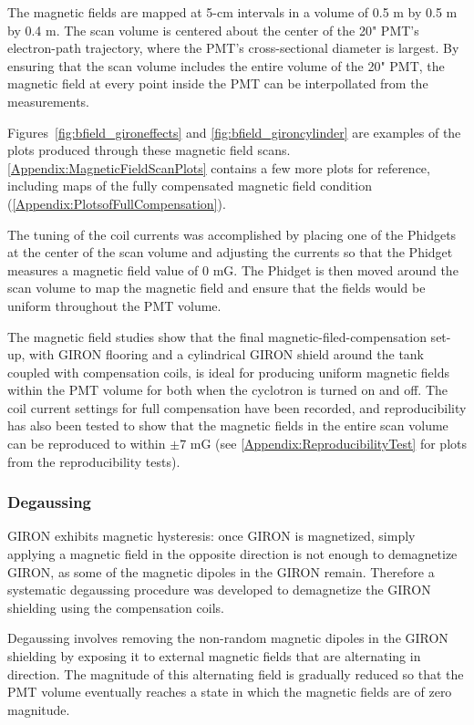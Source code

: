 The magnetic fields are mapped at 5-cm intervals in a volume of 0.5 m by 0.5 m by 0.4 m. The scan volume is centered about the center of the 20" PMT's electron-path trajectory, where the PMT's cross-sectional diameter is largest. By ensuring that the scan volume includes the entire volume of the 20" PMT, the magnetic field at every point inside the PMT can be interpollated from the measurements.

Figures~\ref{fig:bfield_gironeffects} and \ref{fig:bfield_gironcylinder} are examples of the plots produced through these magnetic field scans. \ref{Appendix:MagneticFieldScanPlots} contains a few more plots for reference, including maps of the fully compensated magnetic field condition (\ref{Appendix:PlotsofFullCompensation}).

The tuning of the coil currents was accomplished by placing one of the Phidgets at the center of the scan volume and adjusting the currents so that the Phidget measures a magnetic field value of 0 mG. The Phidget is then moved around the scan volume to map the magnetic field and ensure that the fields would be uniform throughout the PMT volume.

The magnetic field studies show that the final magnetic-filed-compensation set-up, with GIRON flooring and a cylindrical GIRON shield around the tank coupled with compensation coils, is ideal for producing uniform magnetic fields within the PMT volume for both when the cyclotron is turned on and off. The coil current settings for full compensation have been recorded, and reproducibility has also been tested to show that the magnetic fields in the entire scan volume can be reproduced to within $\pm7$ mG (see \ref{Appendix:ReproducibilityTest} for plots from the reproducibility tests).


\subsubsection{Degaussing}

GIRON exhibits magnetic hysteresis: once GIRON is magnetized, simply applying a magnetic field in the opposite direction is not enough to demagnetize GIRON, as some of the magnetic dipoles in the GIRON remain. Therefore a systematic degaussing procedure was developed to demagnetize the GIRON shielding using the compensation coils.

Degaussing involves removing the non-random magnetic dipoles in the GIRON shielding by exposing it to external magnetic fields that are alternating in direction. The magnitude of this alternating field is gradually reduced so that the PMT volume eventually reaches a state in which the magnetic fields are of zero magnitude.

